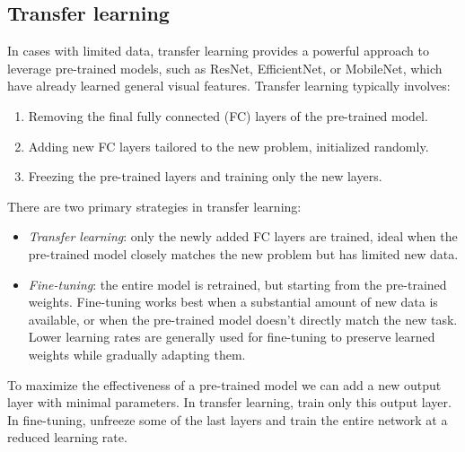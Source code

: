 \subsection{Transfer learning}
In cases with limited data, transfer learning provides a powerful approach to leverage pre-trained models, such as ResNet, EfficientNet, or MobileNet, which have already learned general visual features. Transfer learning typically involves:
\begin{enumerate} 
    \item Removing the final fully connected (FC) layers of the pre-trained model. 
    \item Adding new FC layers tailored to the new problem, initialized randomly. 
    \item Freezing the pre-trained layers and training only the new layers.
\end{enumerate}
There are two primary strategies in transfer learning:
\begin{itemize}
    \item \textit{Transfer learning}: only the newly added FC layers are trained, ideal when the pre-trained model closely matches the new problem but has limited new data.
    \item \textit{Fine-tuning}: the entire model is retrained, but starting from the pre-trained weights. 
        Fine-tuning works best when a substantial amount of new data is available, or when the pre-trained model doesn't directly match the new task. 
        Lower learning rates are generally used for fine-tuning to preserve learned weights while gradually adapting them.
\end{itemize}
To maximize the effectiveness of a pre-trained model we can add a new output layer with minimal parameters.
In transfer learning, train only this output layer.
In fine-tuning, unfreeze some of the last layers and train the entire network at a reduced learning rate.
